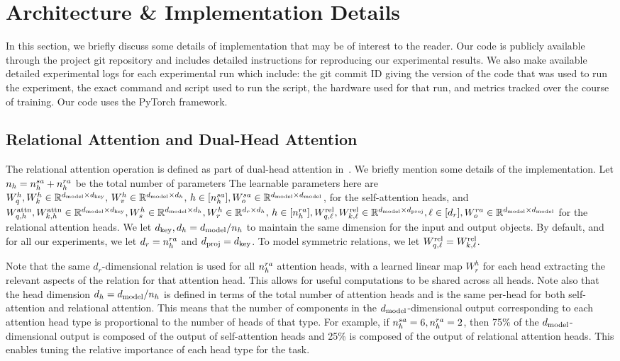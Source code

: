 
\section{Architecture \& Implementation Details}\label{sec:appendix_implementation}

In this section, we briefly discuss some details of implementation that may be of interest to the reader. Our code is publicly available through the project git repository and includes detailed instructions for reproducing our experimental results. We also make available detailed experimental logs for each experimental run which include: the git commit ID giving the version of the code that was used to run the experiment, the exact command and script used to run the script, the hardware used for that run, and metrics tracked over the course of training. Our code uses the PyTorch framework.

\subsection{Relational Attention and Dual-Head Attention}

The relational attention operation is defined as part of dual-head attention in~. We briefly mention some details of the implementation. Let $n_h = n_h^{sa} + n_h^{ra}$ be the total number of parameters The learnable parameters here are $W_q^h, W_k^h \in \mathbb{R}^{d_{\mathrm{model}} \times d_{\mathrm{key}}},\, W_v^h \in \mathbb{R}^{d_{\mathrm{model}} \times d_h}, \, h \in [n_h^{sa}], W_o^{sa} \in \mathbb{R}^{d_{\mathrm{model}} \times d_{\mathrm{model}}}$, for the self-attention heads, and $W_{q, h}^{\mathrm{attn}}, W_{k, h}^{\mathrm{attn}} \in \mathbb{R}^{d_{\mathrm{model}} \times d_{\mathrm{key}}}, W_s^h \in \mathbb{R}^{d_{\mathrm{model}} \times d_h}, W_r^h \in \mathbb{R}^{d_r \times d_h},\, h \in [n_h^{ra}], W_{q, \ell}^{\mathrm{rel}}, W_{k, \ell}^{\mathrm{rel}} \in \mathbb{R}^{d_{\mathrm{model}} \times d_{\mathrm{proj}}}, \ell \in [d_r], W_o^{ra} \in \mathbb{R}^{d_{\mathrm{model}} \times d_{\mathrm{model}}}$ for the relational attention heads. We let $d_{\mathrm{key}}, d_h = d_{\mathrm{model}} / n_h$ to maintain the same dimension for the input and output objects. By default, and for all our experiments, we let $d_r = n_h^{ra}$ and $d_{\mathrm{proj}} = d_{\mathrm{key}}$. To model symmetric relations, we let $W_{q, \ell}^{\mathrm{rel}} = W_{k, \ell}^{\mathrm{rel}}$.

Note that the same $d_r$-dimensional relation is used for all $n_h^{ra}$ attention heads, with a learned linear map $W_r^h$ for each head extracting the relevant aspects of the relation for that attention head. This allows for useful computations to be shared across all heads. Note also that the head dimension $d_h = d_{\mathrm{model}} / n_h$ is defined in terms of the total number of attention heads and is the same per-head for both self-attention and relational attention. This means that the number of components in the $d_{\mathrm{model}}$-dimensional output corresponding to each attention head type is proportional to the number of heads of that type. For example, if $n_h^{sa} = 6, n_h^{ra} = 2$, then 75\% of the $d_{\mathrm{model}}$-dimensional output is composed of the output of self-attention heads and 25\% is composed of the output of relational attention heads. This enables tuning the relative importance of each head type for the task.

